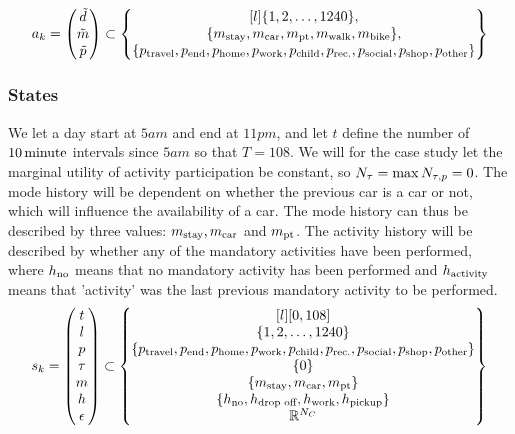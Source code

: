 \begin{equation} 
a_k = \begin{pmatrix}
\act{d} \\
\act{m} \\
\act{p}    
\end{pmatrix}
\subset
\begin{Bmatrix*}[l]
\{1,2,\dots, 1240\}, \\
\{m_{\text{stay}},\m{car},\m{pt},\m{walk},\m{bike}\}, \\
\{ p_{\text{travel}},p_{\text{end}},\p{home},\p{work},\p{child},\p{rec.},\p{social},\p{shop},\p{other}\} 
\end{Bmatrix*}
\end{equation}
\subsubsection{States}
We let a day start at $5\unit{am}$ and end at $11\unit{pm}$, and let $t$ define the number of $10\, \mathrm{minute}$ intervals since $5\unit{am}$ so that $T=108$.
We will for the case study let the marginal utility of activity participation be constant, so $N_\tau=\max{N_{\tau,p}}=0$. The mode history will be dependent on whether the previous car is a car or not, which will influence the availability of a car. The mode history can thus be described by three values: $m_{\text{stay}},m_{\text{car}}$ and $m_{\text{pt}}$. The activity history will be described by whether any of the mandatory activities have been performed, where $h_\text{no}$ means that no mandatory activity has been performed and $h_\text{activity}$ means that 'activity' was the last previous mandatory activity to be performed. 
\begin{equation}
\s{k} = \begin{pmatrix}
t \\
l \\
p \\
\atime\\
m \\
\amem \\
\epsilon
\end{pmatrix}
\subset
\begin{Bmatrix*}[l]
[0,108] \\
\{1,2,\dots, 1240\} \\
\{ p_{\text{travel}},p_{\text{end}},\p{home},\p{work},\p{child},\p{rec.},\p{social},\p{shop},\p{other}\}  \\
\{0\} \\
\{m_{\text{stay}},\m{car},\m{pt} \}\\
\{\amemm{no},\amemm{drop off}, \amemm{work},\amemm{pickup}\}\\
\rr^{N_C}
\end{Bmatrix*}
\end{equation}

